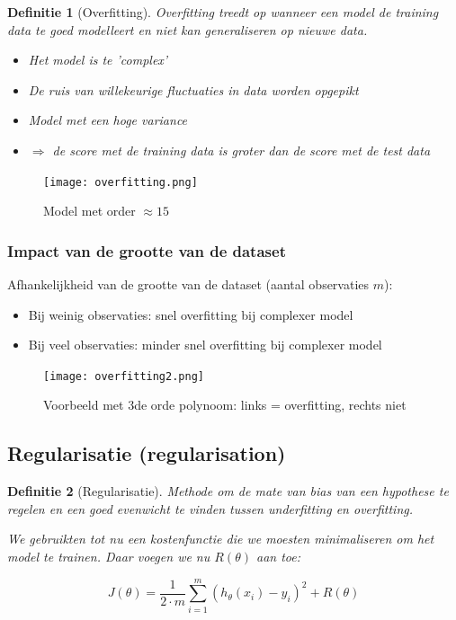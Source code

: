\documentclass{article}
\newtheorem{theorem}{Definitie}[section]
\begin{document}
\begin{theorem}[Overfitting]
Overfitting treedt op wanneer een model de training data te goed modelleert en niet kan
    generaliseren op nieuwe data.  

\begin{itemize}
    \item Het model is te 'complex'
    \item De ruis van willekeurige fluctuaties in data worden opgepikt
    \item Model met een hoge variance
    \item $\Rightarrow$ de score met de training data is groter dan de score met de test data
\end{itemize}
\end{theorem}

\begin{figure}[H]
    \centering
    \texttt{[image: overfitting.png]}
    \caption{Model met order $\approx 15$}
\end{figure}

\subsubsection{Impact van de grootte van de dataset}

Afhankelijkheid van de grootte van de dataset (aantal observaties $m$):

\begin{itemize}
    \item Bij weinig observaties: snel overfitting bij complexer model
    \item Bij veel observaties: minder snel overfitting bij complexer model
\end{itemize}

\begin{figure}[H]
    \centering
    \texttt{[image: overfitting2.png]}
    \caption{Voorbeeld met 3de orde polynoom: links = overfitting, rechts niet}
\end{figure}

\subsection{Regularisatie (regularisation)}

\begin{theorem}[Regularisatie]
Methode om de mate van bias van een hypothese te regelen en een 
goed evenwicht te vinden tussen underfitting en overfitting.

We gebruikten tot nu een kostenfunctie die we moesten minimaliseren om het model te trainen. Daar voegen we nu $R(\theta)$ aan toe:

\begin{equation}
J(\theta) = \frac{1}{2\cdot m} \sum_{i=1}^m (h_{\theta}(x_i) - y_i)^2 + R(\theta)
\end{equation}
\end{theorem}
\end{document}
